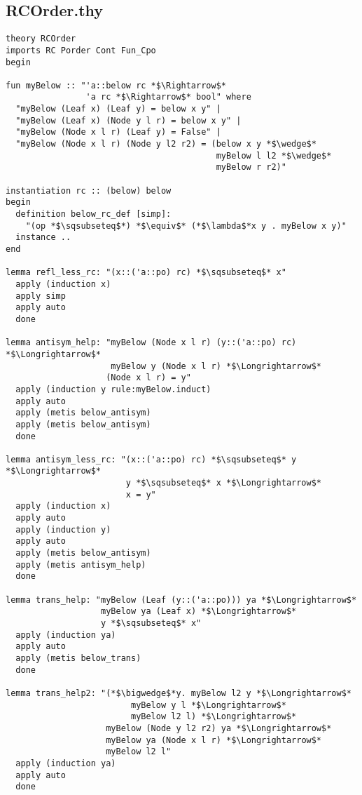 \newpage

\subsection{RCOrder.thy}
%

\begin{lstlisting}[language=Isabelle]
theory RCOrder
imports RC Porder Cont Fun_Cpo
begin

fun myBelow :: "'a::below rc *$\Rightarrow$* 
                'a rc *$\Rightarrow$* bool" where
  "myBelow (Leaf x) (Leaf y) = below x y" |
  "myBelow (Leaf x) (Node y l r) = below x y" |
  "myBelow (Node x l r) (Leaf y) = False" |
  "myBelow (Node x l r) (Node y l2 r2) = (below x y *$\wedge$* 
                                          myBelow l l2 *$\wedge$* 
                                          myBelow r r2)"

instantiation rc :: (below) below
begin
  definition below_rc_def [simp]:
    "(op *$\sqsubseteq$*) *$\equiv$* (*$\lambda$*x y . myBelow x y)"
  instance ..
end

lemma refl_less_rc: "(x::('a::po) rc) *$\sqsubseteq$* x"
  apply (induction x)
  apply simp
  apply auto
  done

lemma antisym_help: "myBelow (Node x l r) (y::('a::po) rc) *$\Longrightarrow$* 
                     myBelow y (Node x l r) *$\Longrightarrow$* 
                    (Node x l r) = y"
  apply (induction y rule:myBelow.induct)
  apply auto
  apply (metis below_antisym)
  apply (metis below_antisym)
  done

lemma antisym_less_rc: "(x::('a::po) rc) *$\sqsubseteq$* y *$\Longrightarrow$* 
                        y *$\sqsubseteq$* x *$\Longrightarrow$* 
                        x = y"
  apply (induction x)
  apply auto
  apply (induction y)
  apply auto
  apply (metis below_antisym)
  apply (metis antisym_help)
  done

lemma trans_help: "myBelow (Leaf (y::('a::po))) ya *$\Longrightarrow$* 
                   myBelow ya (Leaf x) *$\Longrightarrow$* 
                   y *$\sqsubseteq$* x"
  apply (induction ya)
  apply auto
  apply (metis below_trans)
  done

lemma trans_help2: "(*$\bigwedge$*y. myBelow l2 y *$\Longrightarrow$* 
                         myBelow y l *$\Longrightarrow$* 
                         myBelow l2 l) *$\Longrightarrow$*
                    myBelow (Node y l2 r2) ya *$\Longrightarrow$* 
                    myBelow ya (Node x l r) *$\Longrightarrow$* 
                    myBelow l2 l"
  apply (induction ya)
  apply auto
  done


\end{lstlisting}
